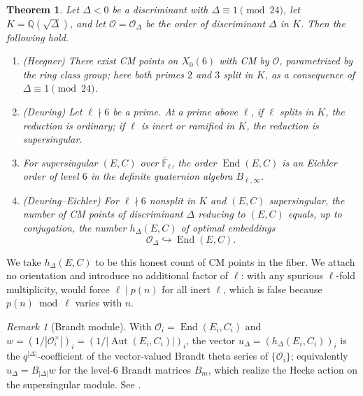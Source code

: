 \documentclass[12pt]{amsart}
\newtheorem{theorem}{Theorem}[section]
\theoremstyle{definition}
\theoremstyle{remark}
\newtheorem{remark}{Remark}
\newcommand{\cO}{\mathcal{O}}
\newcommand{\End}{\operatorname{End}}
\newcommand{\Aut}{\operatorname{Aut}}
\begin{document}
\begin{theorem}
\label{thm:CM}
Let $\Delta<0$ be a discriminant with $\Delta\equiv 1\pmod{24}$, let
$K=\mathbb{Q}(\sqrt{\Delta})$, and let $\mathcal{O}=\mathcal{O}_{\Delta}$
be the order of discriminant $\Delta$ in $K$.  Then the following hold.
\begin{enumerate}
\item[(i)] (Heegner) There exist CM points on $X_0(6)$ with CM by
$\mathcal{O}$, parametrized by the ring class group; here both primes
$2$ and $3$ split in $K$, as a consequence of $\Delta\equiv 1\pmod{24}$.

\item[(ii)] (Deuring) Let $\ell\nmid 6$ be a prime.  At a prime above
$\ell$, if $\ell$ splits in $K$, the reduction is ordinary; if $\ell$ is
inert or ramified in $K$, the reduction is supersingular.

\item[(iii)] For supersingular $(E,C)$ over $\overline{\mathbb{F}}_\ell$,
the order $\operatorname{End}(E,C)$ is an Eichler order of level $6$ in
the definite quaternion algebra $B_{\ell,\infty}$.

\item[(iv)] (Deuring--Eichler) For $\ell\nmid 6$ nonsplit in $K$ and
$(E,C)$ supersingular, the number of CM points of discriminant $\Delta$
reducing to $(E,C)$ equals, up to conjugation, the number $h_{\Delta}(E,C)$ of optimal
embeddings
\[
        \mathcal{O}_{\Delta}\hookrightarrow \operatorname{End}(E,C).
\]
\end{enumerate}
\end{theorem}

We take $h_\Delta(E,C)$ to be this honest count of CM points in the fiber. We attach no
orientation and introduce no additional factor of $\ell$: with any spurious $\ell$-fold
multiplicity,  would force $\ell\mid p(n)$ for all inert $\ell$, which is
false because $p(n)\bmod\ell$ varies with $n$.

\begin{remark}[Brandt module]\label{rmk:brandt}
With $\cO_i=\End(E_i,C_i)$ and $w=(1/|\cO_i^\times|)_i=(1/|\Aut(E_i,C_i)|)_i$, the vector
$u_\Delta=(h_\Delta(E_i,C_i))_i$ is the $q^{|\Delta|}$-coefficient of the vector-valued
Brandt theta series of $\{\cO_i\}$; equivalently $u_\Delta=B_{|\Delta|}w$ for the level-$6$
Brandt matrices $B_m$, which realize the Hecke action on the supersingular module. See
\cite{Pizer,Vigneras}.
\end{remark}
\end{document}
